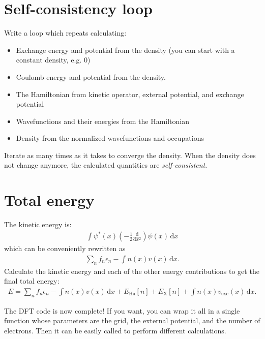 \documentclass{article}
\newcommand{\dee}[0]{\mathrm d}
\newcommand{\idee}[0]{\,\dee}
\newcommand{\diff}[2]{\frac{\dee #1}{\dee #2}}
\newcommand{\Ha}[0]{\mathrm{Ha}}
\newcommand{\X}[0]{\mathrm{X}}
\begin{document}
\section{Self-consistency loop}
Write a loop which repeats calculating:
\begin{itemize}
\item Exchange energy and potential from the density (you can start with a
  constant density, e.g. 0)
\item Coulomb energy and potential from the density.
\item The Hamiltonian from kinetic operator, external potential,
  and exchange potential
\item Wavefunctions and their energies from the Hamiltonian
\item Density from the normalized wavefunctions and occupations
\end{itemize}
Iterate as many times as it takes to converge the density.  When the
density does not change anymore, the calculated quantities are
\emph{self-consistent}.

\section{Total energy}
The kinetic energy is:
\begin{align}
  \int \psi^*(x)\left(-\frac12 \diff{}{x^2}\right) \psi(x) \idee x
\end{align}
which can be conveniently rewritten as
\begin{align}
  \sum_n f_n \epsilon_n - \int n(x) v(x) \idee x.
\end{align}
Calculate the kinetic energy and each of the other energy contributions to get the final total energy:
\begin{align}
  E = \sum_n f_n \epsilon_n - \int n(x) v(x) \idee x
  + E_\Ha[n] + E_\X[n] + \int n(x) v_{\mathrm{exc}}(x) \idee x.
\end{align}

The DFT code is now complete!  If you want, you can wrap it all in a
single function whose parameters are the grid, the external potential,
and the number of electrons.  Then it can be easily called to perform
different calculations.
\end{document}
